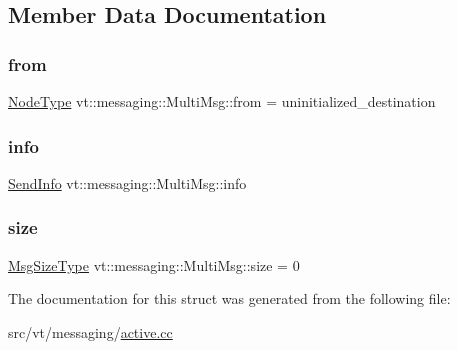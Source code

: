 \subsection{Member Data Documentation}
\mbox{\label{structvt_1_1messaging_1_1_multi_msg_a5686b316a79761a7e75b5206506be048}} 
\subsubsection{\texorpdfstring{from}{from}}
{\footnotesize\ttfamily \hyperlink{namespacevt_a866da9d0efc19c0a1ce79e9e492f47e2}{Node\+Type} vt\+::messaging\+::\+Multi\+Msg\+::from = uninitialized\+\_\+destination\hspace{0.3cm}{\ttfamily [private]}}

\mbox{\label{structvt_1_1messaging_1_1_multi_msg_ad47d1f9a6bb2661d88e11e80b462aaf0}} 
\subsubsection{\texorpdfstring{info}{info}}
{\footnotesize\ttfamily \hyperlink{structvt_1_1messaging_1_1_send_info}{Send\+Info} vt\+::messaging\+::\+Multi\+Msg\+::info\hspace{0.3cm}{\ttfamily [private]}}

\mbox{\label{structvt_1_1messaging_1_1_multi_msg_a05e791d373d9a5c0eb54c55a32af7cb9}} 
\subsubsection{\texorpdfstring{size}{size}}
{\footnotesize\ttfamily \hyperlink{namespacevt_a408e86a8c7c89309b52907dc5a513924}{Msg\+Size\+Type} vt\+::messaging\+::\+Multi\+Msg\+::size = 0\hspace{0.3cm}{\ttfamily [private]}}



The documentation for this struct was generated from the following file\+:\begin{DoxyCompactItemize}
\item 
src/vt/messaging/\hyperlink{active_8cc}{active.\+cc}\end{DoxyCompactItemize}
